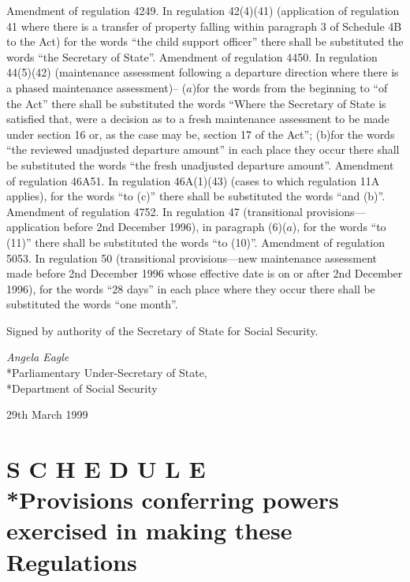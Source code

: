 \documentclass[12pt,a4paper]{article}
\begin{document}
Amendment of regulation 4249.  In regulation 42(4)(41) (application of regulation 41 where there is a transfer of property falling within paragraph 3 of Schedule 4B to the Act) for the words “the child support officer” there shall be substituted the words “the Secretary of State”.
Amendment of regulation 4450.  In regulation 44(5)(42) (maintenance assessment following a departure direction where there is a phased maintenance assessment)–
($a$)for the words from the beginning to “of the Act” there shall be substituted the words “Where the Secretary of State is satisfied that, were a decision as to a fresh maintenance assessment to be made under section 16 or, as the case may be, section 17 of the Act”;
(b)for the words “the reviewed unadjusted departure amount” in each place they occur there shall be substituted the words “the fresh unadjusted departure amount”.
Amendment of regulation 46A51.  In regulation 46A(1)(43) (cases to which regulation 11A applies), for the words “to (c)” there shall be substituted the words “and (b)”.
Amendment of regulation 4752.  In regulation 47 (transitional provisions—application before 2nd December 1996), in paragraph (6)($a$), for the words “to (11)” there shall be substituted the words “to (10)”.
Amendment of regulation 5053.  In regulation 50 (transitional provisions—new maintenance assessment made before 2nd December 1996 whose effective date is on or after 2nd December 1996), for the words “28 days” in each place where they occur there shall be substituted the words “one month”.

\bigskip

Signed 
by authority of the Secretary of State for Social Security.

{\raggedleft
\emph{Angela Eagle}\\*Parliamentary Under-Secretary of State,\\*Department of Social Security

}

29th March 1999

\small

\part[Schedule --- Provisions conferring powers exercised in making these Regulations]{S C H E D U L E\\*Provisions conferring powers exercised in making these Regulations}

\renewcommand\parthead{--- Schedule}
\end{document}
